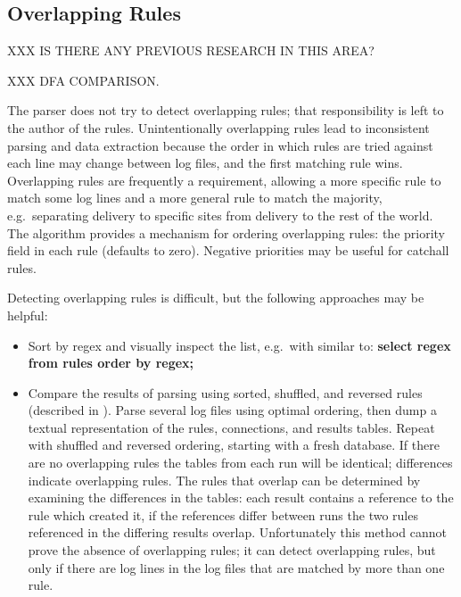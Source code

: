 \subsection{Overlapping Rules}

\label{overlapping rules in architecture}

XXX IS THERE ANY PREVIOUS RESEARCH IN THIS AREA\@?

XXX DFA COMPARISON\@.

The parser does not try to detect overlapping rules; that responsibility is
left to the author of the rules.  Unintentionally overlapping rules lead to
inconsistent parsing and data extraction because the order in which rules
are tried against each line may change between log files, and the first
matching rule wins.  Overlapping rules are frequently a requirement,
allowing a more specific rule to match some log lines and a more general
rule to match the majority, e.g.\ separating  delivery to
specific sites from  delivery to the rest of the world.  The
algorithm provides a mechanism for ordering overlapping rules: the priority
field in each rule (defaults to zero).  Negative priorities may be useful
for catchall rules.

Detecting overlapping rules is difficult, but the following approaches may
be helpful:

\begin{itemize}

    \item Sort by regex and visually inspect the list, e.g.\ with
         similar to: \textbf{select regex from rules order by
        regex;}

    \item Compare the results of parsing using sorted, shuffled, and
        reversed rules (described in ).  Parse several log files using optimal ordering, then
        dump a textual representation of the rules, connections, and
        results tables.  Repeat with shuffled and reversed ordering,
        starting with a fresh database.  If there are no overlapping rules
        the tables from each run will be identical; differences indicate
        overlapping rules.  The rules that overlap can be determined by
        examining the differences in the tables: each result contains a
        reference to the rule which created it, if the references differ
        between runs the two rules referenced in the differing results
        overlap.  Unfortunately this method cannot prove the absence of
        overlapping rules; it can detect overlapping rules, but only if
        there are log lines in the log files that are matched by more than
        one rule.

\end{itemize}

